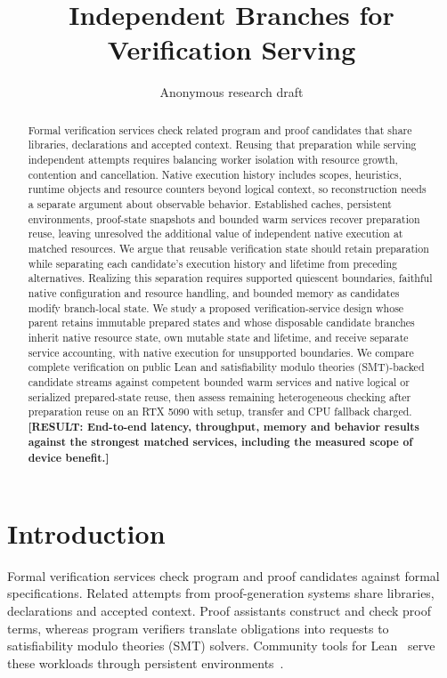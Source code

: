 \documentclass[10pt,twocolumn]{article}
\title{Independent Branches for Verification Serving}
\author{Anonymous research draft}
\date{}
\newcommand{\missing}[1]{\textbf{[RESULT: #1]}}
\begin{document}
\maketitle
\begin{abstract}
Formal verification services check related program and proof candidates that share libraries, declarations and accepted context.
Reusing that preparation while serving independent attempts requires balancing worker isolation with resource growth, contention and cancellation.
Native execution history includes scopes, heuristics, runtime objects and resource counters beyond logical context, so reconstruction needs a separate argument about observable behavior.
Established caches, persistent environments, proof-state snapshots and bounded warm services recover preparation reuse, leaving unresolved the additional value of independent native execution at matched resources.
We argue that reusable verification state should retain preparation while separating each candidate's execution history and lifetime from preceding alternatives.
Realizing this separation requires supported quiescent boundaries, faithful native configuration and resource handling, and bounded memory as candidates modify branch-local state.
We study a proposed verification-service design whose parent retains immutable prepared states and whose disposable candidate branches inherit native resource state, own mutable state and lifetime, and receive separate service accounting, with native execution for unsupported boundaries.
We compare complete verification on public Lean and satisfiability modulo theories (SMT)-backed candidate streams against competent bounded warm services and native logical or serialized prepared-state reuse, then assess remaining heterogeneous checking after preparation reuse on an RTX 5090 with setup, transfer and CPU fallback charged.
\missing{End-to-end latency, throughput, memory and behavior results against the strongest matched services, including the measured scope of device benefit.}
\end{abstract}

\section{Introduction}\label{sec:intro}
Formal verification services check program and proof candidates against formal specifications. Related attempts from proof-generation systems share libraries, declarations and accepted context. Proof assistants construct and check proof terms, whereas program verifiers translate obligations into requests to satisfiability modulo theories (SMT) solvers. Community tools for Lean~\cite{lean4} serve these workloads through persistent environments~\cite{repl}.
\end{document}
